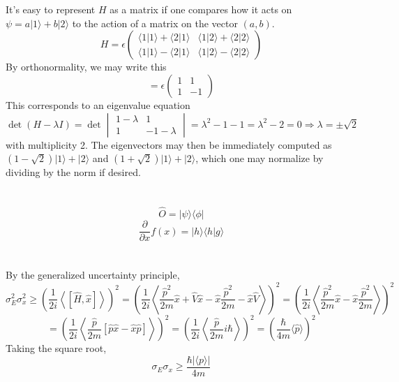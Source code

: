 \documentclass{article}
\begin{document}
\section{}
It's easy to represent $H$ as a matrix if one compares how it acts on $\psi=a|1\rangle+b|2\rangle$ to the action of a matrix on the vector $(a, b)$.
\[H=
  \epsilon\begin{pmatrix}
    \langle 1|1 \rangle + \langle 2|1 \rangle & \langle 1|2 \rangle+\langle 2|2 \rangle \\
    \langle 1|1 \rangle -\langle 2|1 \rangle& \langle 1|2 \rangle-\langle2|2  \rangle
  \end{pmatrix}
\]
By orthonormality, we may write this
\[
  =\epsilon
  \begin{pmatrix}
    1 & 1 \\
    1 & -1
  \end{pmatrix}
\]
This corresponds to an eigenvalue equation
\[
  \det(H-\lambda I)
  =\det
  \begin{vmatrix}
    1-\lambda & 1 \\
    1 & -1-\lambda
  \end{vmatrix}
  =\lambda^{2}-1-1=\lambda^{2}-2=0\Rightarrow \lambda = \pm\sqrt{2}
\]
with multiplicity 2. The eigenvectors may then be immediately computed as $(1-\sqrt{2})|1\rangle+|2\rangle$ and $(1+\sqrt{2})|1\rangle +|2\rangle$, which one may normalize by dividing by the norm if desired.

\section{}

\[
  \hat{O}=|\psi\rangle\langle \phi|
\]
\[
  \frac{\partial}{\partial x}f(x)=|h\rangle\langle h|g \rangle
\]

\section{}
By the generalized uncertainty principle,
\[
  \sigma_{E}^{2}\sigma_{x}^{2}\geq\left( \frac{1}{2i}\left\langle \left[ \hat{H},\hat{x} \right] \right\rangle \right)^{2}
  =\left( \frac{1}{2i}\left\langle \frac{\hat{p}^{2}}{2m}\hat{x}+\hat{V}\hat{x}-\hat{x}\frac{\hat{p}^{2}}{2m}
      -\hat{x}\hat{V} \right\rangle \right)^{2}
  =\left( \frac{1}{2i}\left\langle\frac{\hat{p}^{2}}{2m}\hat{x}-\hat{x}\frac{\hat{p}^{2}}{2m}\right\rangle \right)^{2}
\]
\[
  =\left(  \frac{1}{2i}\left\langle\frac{\hat{p}}{2m}\left[\hat{p}\hat{x}-\hat{x}\hat{p} \right] \right\rangle\right)^{2}
  =\left( \frac{1}{2i}\left\langle\frac{\hat{p}}{2m}i\hbar \right\rangle \right)^{2}
  =\left( \frac{\hbar}{4m}\langle \hat{p} \rangle\right)^{2}
\]
Taking the square root,
\[\sigma_{E}\sigma_{x}\geq \frac{\hbar|\langle p \rangle|}{4m}\]
\end{document}
